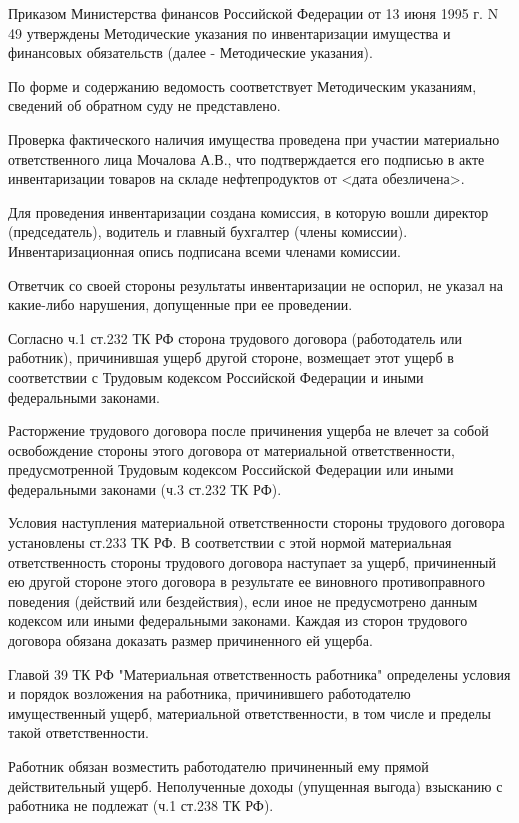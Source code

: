 \documentclass[a4paper]{article}
\begin{document}
		Приказом Министерства финансов Российской Федерации от 13 июня 1995 г. N 49 утверждены Методические указания по инвентаризации имущества и финансовых обязательств (далее - Методические указания).
		
		По форме и содержанию ведомость соответствует Методическим указаниям, сведений об обратном суду не представлено.
		
		Проверка фактического наличия имущества проведена при участии материально ответственного лица Мочалова А.В., что подтверждается его подписью в акте инвентаризации товаров на складе нефтепродуктов от <дата обезличена>.
		
		Для проведения инвентаризации создана комиссия, в которую вошли директор (председатель), водитель и главный бухгалтер (члены комиссии). Инвентаризационная опись подписана всеми членами комиссии.
		
		Ответчик со своей стороны результаты инвентаризации не оспорил, не указал на какие-либо нарушения, допущенные при ее проведении.
		
		Согласно ч.1 ст.232 ТК РФ сторона трудового договора (работодатель или работник), причинившая ущерб другой стороне, возмещает этот ущерб в соответствии с Трудовым кодексом Российской Федерации и иными федеральными законами.
		
		Расторжение трудового договора после причинения ущерба не влечет за собой освобождение стороны этого договора от материальной ответственности, предусмотренной Трудовым кодексом Российской Федерации или иными федеральными законами (ч.3 ст.232 ТК РФ).
		
		Условия наступления материальной ответственности стороны трудового договора установлены ст.233 ТК РФ. В соответствии с этой нормой материальная ответственность стороны трудового договора наступает за ущерб, причиненный ею другой стороне этого договора в результате ее виновного противоправного поведения (действий или бездействия), если иное не предусмотрено данным кодексом или иными федеральными законами. Каждая из сторон трудового договора обязана доказать размер причиненного ей ущерба.
		
		Главой 39 ТК РФ "Материальная ответственность работника" определены условия и порядок возложения на работника, причинившего работодателю имущественный ущерб, материальной ответственности, в том числе и пределы такой ответственности.
		
		Работник обязан возместить работодателю причиненный ему прямой действительный ущерб. Неполученные доходы (упущенная выгода) взысканию с работника не подлежат (ч.1 ст.238 ТК РФ).
		
\end{document}
